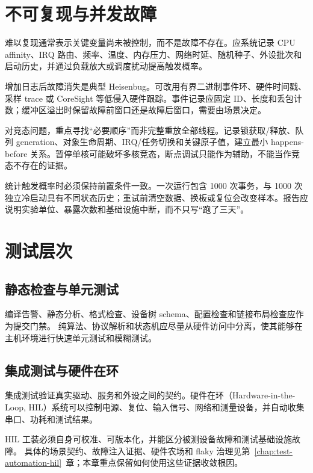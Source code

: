 \section{不可复现与并发故障}

难以复现通常表示关键变量尚未被控制，而不是故障不存在。应系统记录 CPU affinity、IRQ 路由、频率、温度、内存压力、网络时延、随机种子、外设批次和启动历史，并通过负载放大或调度扰动提高触发概率。

增加日志后故障消失是典型 Heisenbug。可改用有界二进制事件环、硬件时间戳、采样 trace 或 CoreSight 等低侵入硬件跟踪\cite{linux-coresight-doc}。事件记录应固定 ID、长度和丢包计数；缓冲区溢出时保留故障前窗口还是故障后窗口，需要由场景决定。

对竞态问题，重点寻找“必要顺序”而非完整重放全部线程。记录锁获取/释放、队列 generation、对象生命周期、IRQ/任务切换和关键原子值，建立最小 happens-before 关系。暂停单核可能破坏多核竞态，断点调试只能作为辅助，不能当作竞态不存在的证据。

统计触发概率时必须保持前置条件一致。一次运行包含 1000 次事务，与 1000 次独立冷启动具有不同状态历史；重试前清空数据、换板或复位会改变样本。报告应说明实验单位、暴露次数和基础设施中断，而不只写“跑了三天”。

\section{测试层次}

\subsection{静态检查与单元测试}

编译告警、静态分析、格式检查、设备树 schema、配置检查和链接布局检查应作为提交门禁。
纯算法、协议解析和状态机应尽量从硬件访问中分离，使其能够在主机环境进行快速单元测试和模糊测试。

\subsection{集成测试与硬件在环}

集成测试验证真实驱动、服务和外设之间的契约。硬件在环（Hardware-in-the-Loop, HIL）系统可以控制电源、复位、输入信号、网络和测量设备，并自动收集串口、功耗和测试结果。

HIL 工装必须自身可校准、可版本化，并能区分被测设备故障和测试基础设施故障。
具体的场景契约、故障注入证据、硬件农场和 flaky 治理见第~\ref{chap:test-automation-hil}~章；本章重点保留如何使用这些证据收敛根因。

